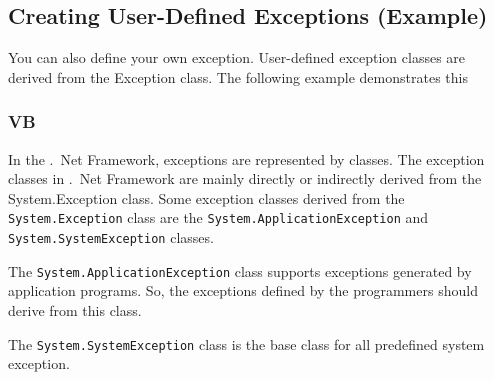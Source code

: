 \subsection*{Creating User-Defined Exceptions (Example)}
You can also define your own exception. User-defined exception classes are derived from the
Exception class. The following example demonstrates this





\subsubsection*{VB}




In the .\ Net Framework, exceptions are represented by classes. The exception classes in .\ Net Framework are mainly directly or indirectly derived from the System.Exception class. Some exception classes derived from the \texttt{System.Exception} class are the \texttt{System.ApplicationException} and \texttt{System.SystemException} classes.

The \texttt{System.ApplicationException} class supports exceptions generated by application programs. So, the exceptions defined by the programmers should derive from this class.

The \texttt{System.SystemException} class is the base class for all predefined system exception.

\newpage\thispagestyle{empty}
